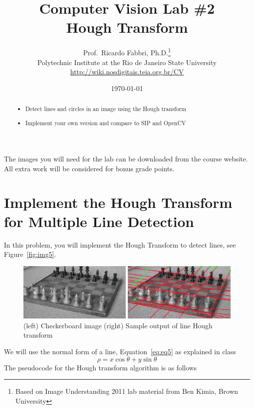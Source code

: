 \documentclass[a4paper]{article}
\begin{document}
\title{\textsf{Computer Vision Lab \#2\\ Hough Transform}
} 

\author{Prof.\ Ricardo Fabbri, Ph.D.\footnote{Based on Image Understanding
2011 lab material from Ben Kimia, Brown University}\\[1em]
Polytechnic Institute at the Rio de Janeiro State University\\
\url{http://wiki.nosdigitais.teia.org.br/CV}
}
 

\date{\today}
\maketitle
\begin{abstract}
\noindent\begin{itemize}
\item Detect lines and circles in an image using the Hough transform
\item Implement your own version and compare to SIP and OpenCV
\end{itemize}
\end{abstract}
\vspace{2em}



The images you will need for the lab can be downloaded from the course
website. All extra work will be considered for bonus grade points.

\section{Implement the Hough Transform for Multiple Line Detection}

In this problem, you will implement the Hough Transform to detect lines, see
Figure~\ref{fig:img5}.
\begin{figure}[t]
\centering
\includegraphics[width=0.8\linewidth]{figs/line-hough.png}%
\caption{%
(left) Checkerboard image (right) Sample output of line Hough transform
}\label{fig:img1}
\end{figure}
We will use the normal form of a line, Equation~\ref{eq:eq5} as explained in
class
\begin{equation}\label{eq:eq5}
\rho = x\cos\theta + y\sin\theta
\end{equation}
The pseudocode for the Hough transform algorithm is as follows
\end{document}
